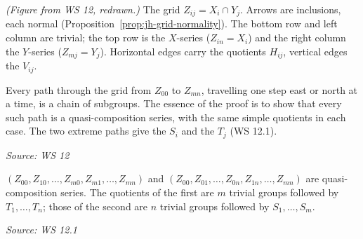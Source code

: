 \documentclass[11pt]{report}
\newcommand{\srcline}[1]{\par\hfill{\footnotesize\textit{Source: #1}}}
\begin{document}
\begin{center}
\end{center}

\textit{(Figure from WS 12, redrawn.)} The grid $Z_{ij} = X_i \cap Y_j$. Arrows are inclusions, each normal (Proposition~\ref{prop:jh-grid-normality}). The bottom row and left column are trivial; the top row is the $X$-series ($Z_{in} = X_i$) and the right column the $Y$-series ($Z_{mj} = Y_j$). Horizontal edges carry the quotients $H_{ij}$, vertical edges the $V_{ij}$.

\begin{rembox}\label{rem:jh-strategy}
Every path through the grid from $Z_{00}$ to $Z_{mn}$, travelling one step east or north at a time, is a chain of subgroups. The essence of the proof is to show that every such path is a quasi-composition series, with the same simple quotients in each case. The two extreme paths give the $S_i$ and the $T_j$ (WS 12.1).
\srcline{WS 12}
\end{rembox}

\begin{propbox}\label{prop:jh-edge-paths}
$(Z_{00}, Z_{10}, \ldots, Z_{m0}, Z_{m1}, \ldots, Z_{mn})$ and $(Z_{00}, Z_{01}, \ldots, Z_{0n}, Z_{1n}, \ldots, Z_{mn})$ are quasi-composition series. The quotients of the first are $m$ trivial groups followed by $T_1, \ldots, T_n$; those of the second are $n$ trivial groups followed by $S_1, \ldots, S_m$.
\srcline{WS 12.1}
\end{propbox}
\end{document}
